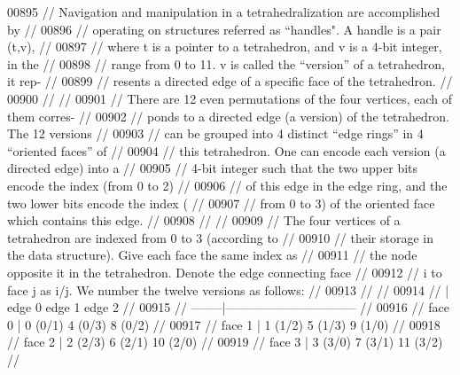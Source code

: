 \begin{DoxyCode}
00895 \textcolor{comment}{// Navigation and manipulation in a tetrahedralization are accomplished by   //}
00896 \textcolor{comment}{// operating on structures referred as ``handles". A handle is a pair (t,v), //}
00897 \textcolor{comment}{// where t is a pointer to a tetrahedron, and v is a 4-bit integer, in the   //}
00898 \textcolor{comment}{// range from 0 to 11. v is called the ``version'' of a tetrahedron, it rep- //}
00899 \textcolor{comment}{// resents a directed edge of a specific face of the tetrahedron.            //}
00900 \textcolor{comment}{//                                                                           //}
00901 \textcolor{comment}{// There are 12 even permutations of the four vertices, each of them corres- //}
00902 \textcolor{comment}{// ponds to a directed edge (a version) of the tetrahedron.  The 12 versions //}
00903 \textcolor{comment}{// can be grouped into 4 distinct ``edge rings'' in 4 ``oriented faces'' of  //}
00904 \textcolor{comment}{// this tetrahedron.  One can encode each version (a directed edge) into a   //}
00905 \textcolor{comment}{// 4-bit integer such that the two upper bits encode the index (from 0 to 2) //}
00906 \textcolor{comment}{// of this edge in the edge ring, and the two lower bits encode the index (  //}
00907 \textcolor{comment}{// from 0 to 3) of the oriented face which contains this edge.               //  }
00908 \textcolor{comment}{//                                                                           //}
00909 \textcolor{comment}{// The four vertices of a tetrahedron are indexed from 0 to 3 (according to  //}
00910 \textcolor{comment}{// their storage in the data structure).  Give each face the same index as   //}
00911 \textcolor{comment}{// the node opposite it in the tetrahedron.  Denote the edge connecting face //}
00912 \textcolor{comment}{// i to face j as i/j. We number the twelve versions as follows:             //}
00913 \textcolor{comment}{//                                                                           //}
00914 \textcolor{comment}{//           |   edge 0     edge 1     edge 2                                //}
00915 \textcolor{comment}{//   --------|--------------------------------                               //}
00916 \textcolor{comment}{//    face 0 |   0 (0/1)    4 (0/3)    8 (0/2)                               //}
00917 \textcolor{comment}{//    face 1 |   1 (1/2)    5 (1/3)    9 (1/0)                               //}
00918 \textcolor{comment}{//    face 2 |   2 (2/3)    6 (2/1)   10 (2/0)                               //}
00919 \textcolor{comment}{//    face 3 |   3 (3/0)    7 (3/1)   11 (3/2)                               //}

\end{DoxyCode}
